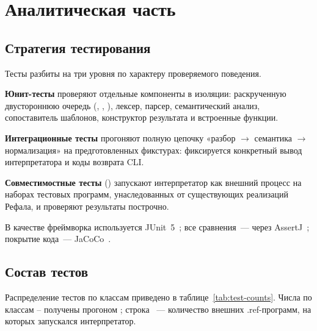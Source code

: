 \section{Аналитическая часть}
\label{sec:anal}

\subsection{Стратегия тестирования}
\label{subsec:test-strategy}

Тесты разбиты на три уровня по характеру проверяемого поведения.

\textbf{Юнит-тесты} проверяют отдельные компоненты в изоляции: раскрученную
двустороннюю очередь (, , ),
лексер, парсер, семантический анализ, сопоставитель шаблонов,
конструктор результата и встроенные функции.

\textbf{Интеграционные тесты} прогоняют полную цепочку «разбор
$\to$ семантика $\to$ нормализация» на предготовленных фикстурах:
фиксируется конкретный вывод интерпретатора и коды возврата CLI.

\textbf{Совместимостные тесты} () запускают
интерпретатор как внешний процесс на наборах тестовых программ, унаследованных
от существующих реализаций Рефала, и проверяют результаты построчно.

В качестве фреймворка используется JUnit~5~\cite{junit5_guide};
все сравнения~--- через AssertJ~\cite{assertj_docs};
покрытие кода~--- JaCoCo~\cite{jacoco_docs}.

\subsection{Состав тестов}
\label{subsec:test-counts}

Распределение тестов по классам приведено в таблице~\ref{tab:test-counts}.
Числа по классам -- получены
прогоном ; строка ~---
количество внешних .ref-программ, на которых запускался интерпретатор.

